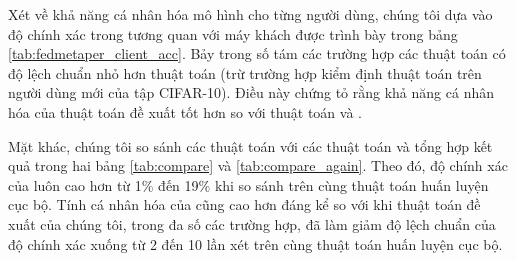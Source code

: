\begin{table}[H]
    \centering
    \caption{Bảng độ chính xác (\%) của thuật toán FedPer và các thuật toán FedMeta-Per tính trên máy khách (dữ liệu Non-IID)}
    \label{tab:fedmetaper_client_acc}
\end{table}

Xét về khả năng cá nhân hóa mô hình cho từng người dùng, chúng tôi dựa vào độ chính xác trong tương quan với máy khách được trình bày trong bảng \ref{tab:fedmetaper_client_acc}. Bảy trong số tám các trường hợp các thuật toán  có độ lệch chuẩn nhỏ hơn thuật toán  (trừ trường hợp kiểm định thuật toán  trên người dùng mới của tập CIFAR-10). Điều này chứng tỏ rằng khả năng cá nhân hóa của thuật toán đề xuất tốt hơn so với thuật toán  và .

Mặt khác, chúng tôi so sánh các thuật toán  với các thuật toán  và tổng hợp kết quả trong hai bảng \ref{tab:compare} và \ref{tab:compare_again}. Theo đó, độ chính xác của  luôn cao hơn  từ 1\% đến 19\% khi so sánh trên cùng thuật toán huấn luyện cục bộ. Tính cá nhân hóa của  cũng cao hơn đáng kể so với  khi thuật toán đề xuất của chúng tôi, trong đa số các trường hợp, đã làm giảm độ lệch chuẩn của độ chính xác xuống từ 2 đến 10 lần xét trên cùng thuật toán huấn luyện cục bộ.

